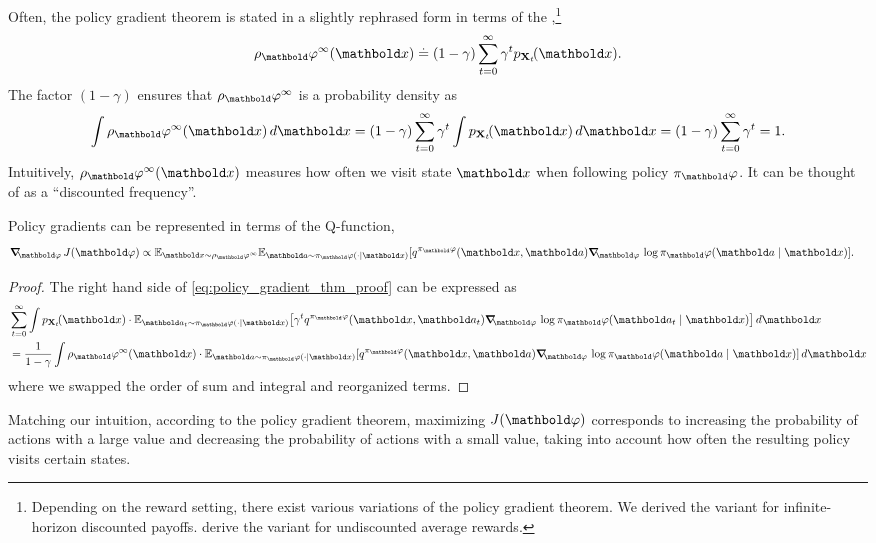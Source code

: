 Often, the policy gradient theorem is stated in a slightly rephrased form in terms of the ,\footnote{Depending on the reward setting, there exist various variations of the policy gradient theorem. We derived the variant for infinite-horizon discounted payoffs.  derive the variant for undiscounted average rewards.} \begin{align}
  \rho_\vvarphi^\infty(\vx) \defeq (1-\gamma) \sum_{t=0}^\infty \gamma^t p_{\rX_t}\!(\vx).
\end{align}
The factor $(1-\gamma)$ ensures that $\rho_\vvarphi^\infty$ is a probability density as \begin{align*}
  \int \rho_\vvarphi^\infty(\vx) \,d\vx = (1-\gamma) \sum_{t=0}^\infty \gamma^t \int p_{\rX_t}\!(\vx) \,d\vx = (1-\gamma) \sum_{t=0}^\infty \gamma^t = 1.
\end{align*}
Intuitively, $\rho_\vvarphi^\infty(\vx)$ measures how often we visit state $\vx$ when following policy $\pi_\vvarphi$.
It can be thought of as a ``discounted frequency''.

\begin{thm}
  Policy gradients can be represented in terms of the Q-function, \begin{align}
    \grad_\vvarphi \j{\vvarphi} &\propto \E*[\vx \sim \rho_\vvarphi^\infty]{\E[\va \sim \pi_\vvarphi(\cdot \mid \vx)]{\q[\pi_\vvarphi]{\vx}{\va} \grad_\vvarphi \log \pi_\vvarphi(\va \mid \vx)}}. \label{eq:policy_gradient_thm}
  \end{align}
\end{thm}
\begin{proof}
  The right hand side of \cref{eq:policy_gradient_thm_proof} can be expressed as \begin{align*}
    &\sum_{t=0}^\infty \int p_{\rX_t}\!(\vx) \cdot \E[\va_t \sim \pi_\vvarphi(\cdot \mid \vx)]{\gamma^t \q[\pi_\vvarphi]{\vx}{\va_t} \grad_\vvarphi \log \pi_\vvarphi(\va_t \mid \vx)} \,d\vx \\
    &= \frac{1}{1-\gamma} \int \rho_\vvarphi^\infty(\vx) \cdot \E[\va \sim \pi_\vvarphi(\cdot \mid \vx)]{\q[\pi_\vvarphi]{\vx}{\va} \grad_\vvarphi \log \pi_\vvarphi(\va \mid \vx)} \,d\vx
  \end{align*} where we swapped the order of sum and integral and reorganized terms.
\end{proof}

Matching our intuition, according to the policy gradient theorem, maximizing $\j{\vvarphi}$ corresponds to increasing the probability of actions with a large value and decreasing the probability of actions with a small value, taking into account how often the resulting policy visits certain states.

